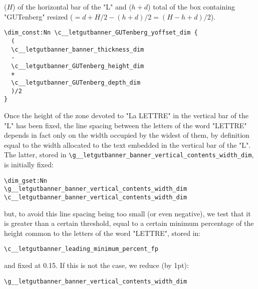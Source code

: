\documentclass{letgut}
\begin{document}
(\(H\)) of the horizontal bar of the "L" and (\(h+d\)) total of the box containing
"GUTenberg" resized (\(=d+H/2-(h+d)/2=(H-h+d)/2\)).
\begin{lstlisting}
\dim_const:Nn \c__letgutbanner_GUTenberg_yoffset_dim {
  (
  \c__letgutbanner_banner_thickness_dim
  -
  \c__letgutbanner_GUTenberg_height_dim
  +
  \c__letgutbanner_GUTenberg_depth_dim
  )/2
}
\end{lstlisting}
Once the height of the zone devoted to "La LETTRE" in the vertical bar of the
"L" has been fixed, the line spacing between the letters of the word "LETTRE"
depends in fact only on the width occupied by the widest of them, by definition
equal to the width allocated to the text embedded in the vertical bar of the
"L". The latter, stored in \lstinline+\g__letgutbanner_banner_vertical_contents_width_dim+, is
initially fixed:
\begin{lstlisting}
\dim_gset:Nn
\g__letgutbanner_banner_vertical_contents_width_dim
\c__letgutbanner_banner_vertical_contents_width_dim
\end{lstlisting}
but, to avoid this line spacing being too small (or even negative), we test that
it is greater than a certain threshold, equal to a certain minimum percentage of
the height common to the letters of the word "LETTRE", stored in:

\lstinline+\c__letgutbanner_leading_minimum_percent_fp+

and fixed at 0.15. If this is not the
case, we reduce (by 1pt):

\lstinline+\g__letgutbanner_banner_vertical_contents_width_dim+
\end{document}
